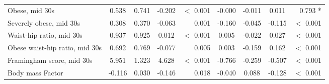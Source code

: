 \begin{tabular}{l c c c r c c c r}
Obese, mid 30s & 0.538 & 0.741 & -0.202 & $ < $ 0.001 & -0.000 & -0.011 & 0.011 & 0.793 * \\
Severely obese, mid 30s & 0.308 & 0.370 & -0.063 & 0.001 & -0.160 & -0.045 & -0.115 & $ < $ 0.001 \\
Waist-hip ratio, mid 30s & 0.937 & 0.925 & 0.012 & $ < $ 0.001 & 0.005 & -0.022 & 0.027 & $ < $ 0.001 \\
Obese waist-hip ratio, mid 30s & 0.692 & 0.769 & -0.077 & 0.005 & 0.003 & -0.159 & 0.162 & $ < $ 0.001 \\
Framingham score, mid 30s & 5.951 & 1.323 & 4.628 & $ < $ 0.001 & -0.766 & -0.259 & -0.507 & $ < $ 0.001 \\
Body mass Factor & -0.116 & 0.030 & -0.146 & 0.018 & -0.040 & 0.088 & -0.128 & $ < $ 0.001 \\
\bottomrule
\end{tabular}
